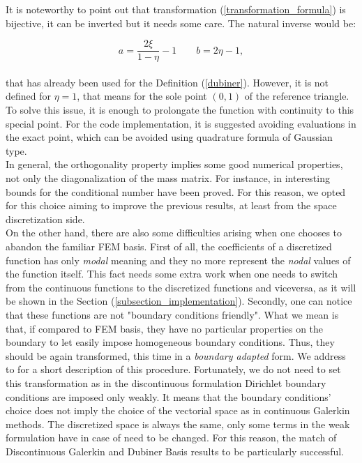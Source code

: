 \documentclass[a4paper,11pt]{article}
\begin{document}
    \noindent It is noteworthy to point out that transformation (\ref{transformation_formula}) is bijective, it can be inverted but it needs some care. The natural inverse would be:
    
    \begin{equation*}
    a = \frac{2\xi}{1-\eta}-1 \quad \quad b = 2\eta-1,
    \end{equation*}
    \vspace{2mm} \\
    \noindent that has already been used for the Definition (\ref{dubiner}). However, it is not defined for $\eta=1$, that means for the sole point $(0,1)$ of the reference triangle. To solve this issue, it is enough to prolongate the function with continuity to this special point. For the code implementation, it is suggested avoiding evaluations in the exact point, which can be avoided using quadrature formula of Gaussian type. \\
    
    \noindent In general, the orthogonality property implies some good numerical properties, not only the diagonalization of the mass matrix. For instance, in \cite{antonietti} interesting bounds for the conditional number have been proved. For this reason, we opted for this choice aiming to improve the previous results, at least from the space discretization side. \\
    
    \noindent On the other hand, there are also some difficulties arising when one chooses to abandon the familiar FEM basis. First of all, the coefficients of a discretized function has only \emph{modal} meaning and they no more represent the \emph{nodal} values of the function itself. This fact needs some extra work when one needs to switch from the continuous functions to the discretized functions and viceversa, as it will be shown in the Section (\ref{subsection_implementation}). Secondly, one can notice that these functions are not "boundary conditions friendly". What we mean is that, if compared to FEM basis, they have no particular properties on the boundary to let easily impose homogeneous boundary conditions. Thus, they should be again transformed, this time in a \emph{boundary adapted} form. We address to \cite{napde} for a short description of this procedure. Fortunately, we do not need to set this transformation as in the discontinuous formulation Dirichlet boundary conditions are imposed only weakly. It means that the boundary conditions' choice does not imply the choice of the vectorial space as in continuous Galerkin methods. The discretized space is always the same, only some terms in the weak formulation have in case of need to be changed. For this reason, the match of Discontinuous Galerkin and Dubiner Basis results to be particularly successful. \\
    
\end{document}
